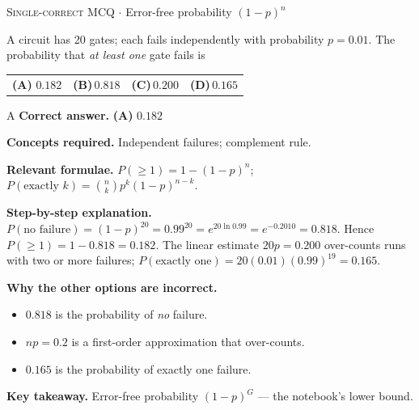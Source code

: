 \documentclass[11pt,a4paper]{article}
\newcommand{\optlabel}[1]{\textbf{(#1)}}
\newcommand{\correctlabel}[1]{\textcolor{okgreen}{\textbf{(#1)}\,\ding{51}}}
\newenvironment{qitem}[1]{\begin{list}{}{\setlength{\leftmargin}{3.3em}\setlength{\labelwidth}{3.1em}%
  \setlength{\labelsep}{0.2em}\setlength{\topsep}{3pt}\setlength{\parsep}{3pt}}\item[\textbf{Q.#1}\hfill]}{\end{list}}
\newcommand{\qsep}{\par\vspace{2pt}{\color{black!15}\hrule}\vspace{4pt}}
\newcommand{\qmeta}[2]{{\footnotesize\color{black!60}\textsc{#1} \;$\cdot$\; #2}\par}
\begin{document}
\begin{qitem}{7}
\qmeta{Single-correct MCQ}{Error-free probability $(1-p)^n$}
A circuit has 20 gates; each fails independently with probability $p = 0.01$. The probability that \emph{at least one} gate fails is
\par\smallskip\noindent\begin{tabularx}{\linewidth}{@{}*{4}{L}@{}}
\correctlabel{A}\,$0.182$ & \optlabel{B}\,$0.818$ & \optlabel{C}\,$0.200$ & \optlabel{D}\,$0.165$
\end{tabularx}
\end{qitem}
\begin{solbox}{A}
\textbf{\color{brand}Correct answer.} \textcolor{okgreen}{\textbf{(A)}} $0.182$

\textbf{\color{brand}Concepts required.} Independent failures; complement rule.

\textbf{\color{brand}Relevant formulae.} $P(\ge1) = 1 - (1-p)^n$; $P(\text{exactly }k) = \binom nkp^k(1-p)^{n-k}$.

\textbf{\color{brand}Step-by-step explanation.} $P(\text{no failure}) = (1 - p)^{20} = 0.99^{20} = e^{20\ln0.99} = e^{-0.2010} = 0.818$. Hence
$P(\ge1) = 1 - 0.818 = 0.182$. The linear estimate $20p = 0.200$ over-counts runs with two or more failures;
$P(\text{exactly one}) = 20(0.01)(0.99)^{19} = 0.165$.

\textbf{\color{brand}Why the other options are incorrect.}
\begin{itemize}[leftmargin=2.4em, itemsep=1pt, topsep=2pt]
\item[\textbf{(B)}] $0.818$ is the probability of \emph{no} failure.
\item[\textbf{(C)}] $np = 0.2$ is a first-order approximation that over-counts.
\item[\textbf{(D)}] $0.165$ is the probability of exactly one failure.
\end{itemize}
\textbf{\color{brand}Key takeaway.} Error-free probability $(1-p)^G$ --- the notebook's lower bound.
\end{solbox}
\qsep
\end{document}
